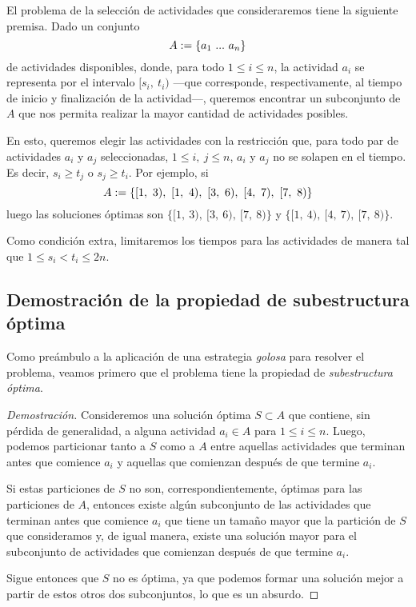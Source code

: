 \vspace{0.5em}
El problema de la selección de actividades que consideraremos tiene la siguiente premisa. Dado un conjunto 
\begin{equation}\\\nonumber
    A := \{a_1\ ...\ a_n \}
\end{equation}
de actividades disponibles, donde, para todo $1 \leq i \leq n$, la actividad $a_i$ se representa por el intervalo $[s_i,\ t_i)$ ---que corresponde, respectivamente, al tiempo de inicio y finalización de la actividad---,  queremos encontrar un subconjunto de $A$ que nos permita realizar la mayor cantidad de actividades posibles. 

En esto, queremos elegir las actividades con la restricción que, para todo par de actividades $a_i$ y $a_j$ seleccionadas, $1 \leq i,\ j \leq n$, $a_i$ y $a_j$ no se solapen en el tiempo. Es decir, $s_i \geq t_j$ o $s_j \geq t_i$. Por ejemplo, si
\begin{equation}\\\nonumber
    A := \{[1,\ 3),\ [1,\ 4),\ [3,\ 6),\ [4,\ 7),\ [7,\ 8)\}
\end{equation}
\noindent luego las soluciones óptimas son $\{[1,\ 3),\ [3,\ 6),\ [7,\ 8)\}$ y $\{[1,\ 4),\ [4,\ 7),\ [7,\ 8)\}$. 

Como condición extra, limitaremos los tiempos para las actividades de manera tal que $1 \leq s_i < t_i \leq 2n$. 

\vspace{0.5em}
\subsection{Demostración de la propiedad de subestructura óptima}

Como preámbulo a la aplicación de una estrategia \textit{golosa} para resolver el problema, veamos primero que el problema tiene la propiedad de \textit{subestructura óptima}. 

\begin{proof}[Demostración]
    Consideremos una solución óptima $S \subset A$ que contiene, sin pérdida de generalidad, a alguna actividad $a_i \in A$ para $1 \leq i \leq n$. Luego, podemos particionar tanto a $S$ como a $A$ entre aquellas actividades que terminan antes que comience $a_i$ y aquellas que comienzan después de que termine $a_i$. 

    Si estas particiones de $S$ no son, correspondientemente, óptimas para las particiones de $A$, entonces existe algún subconjunto de las actividades que terminan antes que comience $a_i$ que tiene un tamaño mayor que la partición de $S$ que consideramos y, de igual manera, existe una solución mayor para el subconjunto de actividades que comienzan después de que termine $a_i$.
    
    Sigue entonces que $S$ no es óptima, ya que podemos formar una solución mejor a partir de estos otros dos subconjuntos, lo que es un absurdo.
\end{proof}

